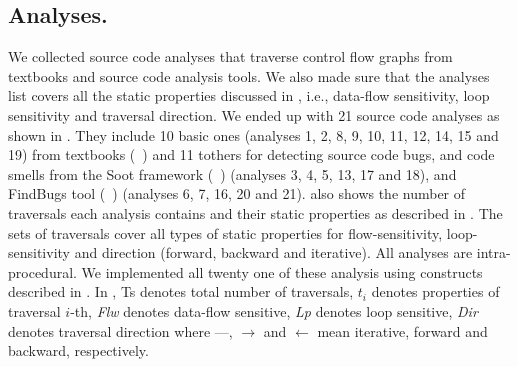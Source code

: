 \subsection{Analyses.} We collected source code analyses that traverse control flow 
graphs from textbooks and source code analysis tools. We also made sure that the 
analyses list covers all the static properties discussed in  
, i.e., data-flow sensitivity, loop sensitivity and 
traversal direction. We ended up with 21 source code analyses as shown in 
. They include 10 basic ones (analyses 1, 2, 8, 9, 
10, 11, 12, 14, 15 and 19) from textbooks (~\cite{compilers, programanalysis}) and 11 
tothers for detecting source code bugs, and code smells from the Soot 
framework (~\cite{vallee1999soot}) (analyses 3, 4, 5, 13, 17 and 18), and 
FindBugs tool (~\cite{findbugs-paste2007}) (analyses 6, 7, 16, 20 and 21). 
 also shows the number of traversals each analysis 
contains and their static properties as described in . 
The sets of traversals cover all types of static properties for 
flow-sensitivity, loop-sensitivity and direction (forward, backward and iterative).
All analyses are intra-procedural. We implemented all twenty one of these analysis using constructs described in . In , Ts denotes total number of traversals, $t_i$ denotes properties of traversal $i$-th, \emph{Flw} denotes data-flow sensitive, \emph{Lp} denotes loop sensitive,
\emph{Dir} denotes traversal direction where ---, $\rightarrow$ and $\leftarrow$ 
mean iterative, forward and backward, respectively.





